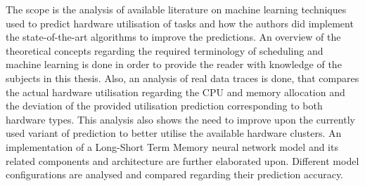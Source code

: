             The scope is the analysis of available literature on machine learning techniques used to predict hardware utilisation of tasks and how the authors did implement the state-of-the-art algorithms to improve the predictions.
            An overview of the theoretical concepts regarding the required terminology of scheduling and machine learning is done in order to provide the reader with knowledge of the subjects in this thesis.
            Also, an analysis of real data traces is done, that compares the actual hardware utilisation regarding the CPU and memory allocation and the deviation of the provided utilisation prediction corresponding to both hardware types. This analysis also shows the need to improve upon the currently used variant of prediction to better utilise the available hardware clusters. 
            An implementation of a Long-Short Term Memory neural network model and its related components and architecture are further elaborated upon. Different model configurations are analysed and compared regarding their prediction accuracy.




